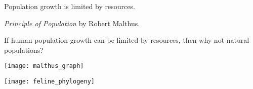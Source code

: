 \documentclass[t]{beamer}
\begin{document}
{
\begin{frame}[t]{Population growth is limited by resources.}
	
	\begin{multicols}{2}
		
		\hangpara \textit{Principle of Population} by Robert Malthus.
		
		\hangpara If human population growth can be limited by resources, then why not natural populations?
		
		\columnbreak
		
		\centering
		\texttt{[image: malthus\_graph]}
		
	\end{multicols}
	
\end{frame}
}

{
\begin{frame}[t]{}
\end{frame}
}


{
\begin{frame}[t]{}
\end{frame}
}

\begin{frame}
\centering
\texttt{[image: feline\_phylogeny]} %
\vfilll
\end{frame}

{
	\begin{frame}[t]{}
\end{frame}
}
\end{document}
